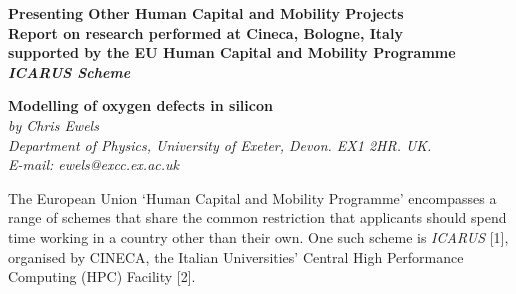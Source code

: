 {%



\newpage
\null

\begin{center}
\LARGE \bf
Presenting Other Human Capital and Mobility Projects\\

\bigskip
\large
Report on research performed at Cineca, Bologne, Italy\\
supported by the EU Human Capital and Mobility Programme\\
{\it ICARUS Scheme}
\end{center}

\bigskip

{\Large \bf Modelling of oxygen defects in silicon}\\
{\large \it by Chris Ewels\\
\normalsize \it 
Department of Physics, University of Exeter, Devon. EX1 2HR. UK. \\
E-mail: ewels@excc.ex.ac.uk}
\bigskip

The European Union `Human Capital and Mobility Programme' encompasses
a range of schemes that share the common restriction that applicants
should spend time working in a country other than their own.  One such
scheme is {\it ICARUS} [1], organised by CINECA, the Italian
Universities' Central High Performance Computing (HPC) Facility [2].

}
